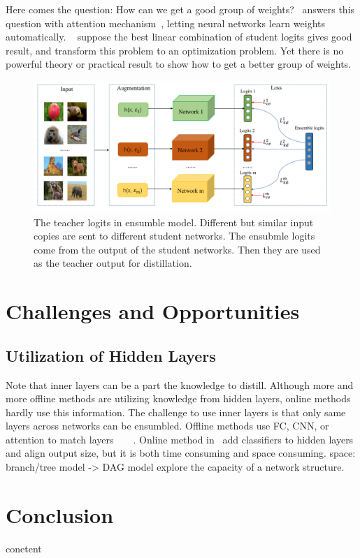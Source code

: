 \documentclass[10pt,twocolumn,letterpaper]{article}
\begin{document}
Here comes the question: How can we get a good group of weights?~\cite{chen2020online} answers this question with attention mechanism~\cite{vaswani2017attention}, letting neural networks learn weights automatically. ~\cite{guo2020online} suppose the best linear
combination of student logits gives good result, and transform this problem to an optimization problem. Yet there is
no powerful theory or practical result to show how to get a better group of weights.


\begin{figure}
\begin{center}
\includegraphics[width=0.9\linewidth]{ensumble_teacher.png}
\end{center}
   \caption{The teacher logits in ensumble model. Different but similar input copies are sent to different student networks. The ensubmle logits come from the output of the student networks. Then they are used as the teacher output for distillation.}
\label{fig:ensumble_teacher}
\end{figure}

\section{Challenges and Opportunities}\label{review}
\subsection{Utilization of Hidden Layers} Note that inner layers can be a part the knowledge to distill.
Although more and more offline methods are utilizing knowledge from hidden layers, online methods hardly use this information.
The challenge to use inner layers is that
only same layers across networks can be ensumbled.
Offline methods use FC, CNN, or attention to match layers~\cite{romero2014fitnets}~\cite{yao2020knowledge}~\cite{DBLP:journals/corr/ZagoruykoK16a}~\cite{chen2021cross}.
Online method in~\cite{yao2020knowledge} add classifiers to hidden layers and align output size,
but it is both time consuming and space consuming.
space: branch/tree model -> DAG model
explore the capacity of a network structure.
\section{Conclusion}
conetent


{\small


}
\end{document}
